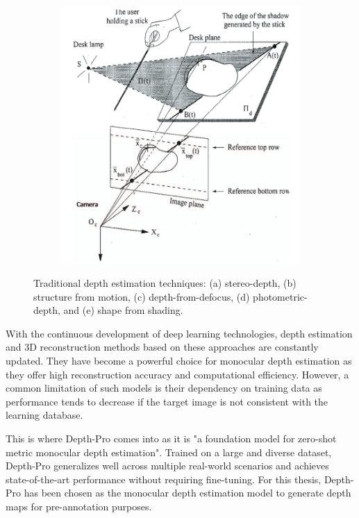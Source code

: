 \begin{figure}[htbp]
\begin{subfigure}[b]{0.18\textwidth}
        \caption{}
        \label{fig:depth_estimation_d}
    \end{subfigure}
    \hfill
    \begin{subfigure}[b]{0.18\textwidth}
        \includegraphics[width=\textwidth]{images/methodology/depth_estimation_e.png}
        \caption{}
        \label{fig:depth_estimation_e}
    \end{subfigure}

    \caption{Traditional depth estimation techniques: (a) stereo-depth, (b) structure from motion, (c) depth-from-defocus, (d) photometric-depth, and (e) shape from shading.}
    \label{fig:depth_estimation}
\end{figure}

With the continuous development of deep learning technologies, depth estimation and 3D reconstruction methods based on these approaches are constantly updated. They have become a powerful choice for monocular depth estimation as they offer high reconstruction accuracy and computational efficiency. However, a common limitation of such models is their dependency on training data as performance tends to decrease if the target image is not consistent with the learning database.

This is where Depth-Pro \cite{depth-pro} comes into as it is "a foundation model for zero-shot metric monocular depth estimation". Trained on a large and diverse dataset, Depth-Pro generalizes well across multiple real-world scenarios and achieves state-of-the-art performance without requiring fine-tuning. For this thesis, Depth-Pro has been chosen as the monocular depth estimation model to generate depth maps for pre-annotation purposes.

